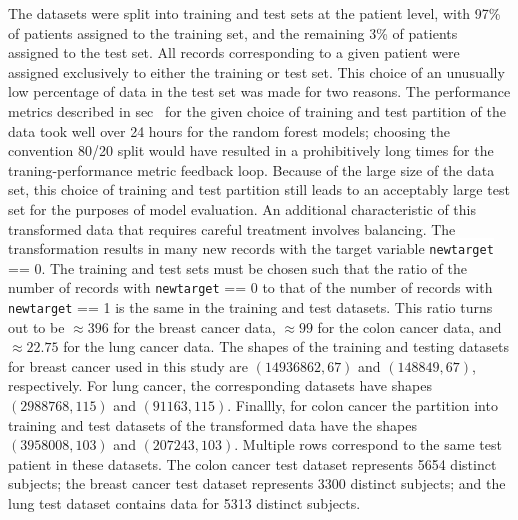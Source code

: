 \documentclass[10pt,letterpaper]{article}
\newcommand{\codewhite}[1]{\colorbox{white}{\texttt{#1}}}
\begin{document}
The datasets were split into training and test sets at the patient level, with 97\% of patients assigned to the training set, and the remaining 3\% of patients assigned to the test set.
All records corresponding to a given patient were assigned exclusively to either the training or test set.
This choice of an unusually low percentage of data in the test set was made for two reasons. The performance metrics described in sec~ for the given choice of training and test partition of the data took well over 24 hours for the random forest models; choosing the convention 80/20 split would have resulted in a prohibitively long times for the traning-performance metric feedback loop. Because of the large size of the data set, this choice of training and test partition still leads to an acceptably large test set for the purposes of model evaluation.
An additional characteristic of this transformed data that requires careful treatment involves balancing. The transformation results in many new records with the target variable \codewhite{newtarget} == 0. The training and test sets must be chosen such that the ratio of the number of records with \codewhite{newtarget} == 0 to that of the number of records with \codewhite{newtarget} == 1 is the same in the training and test datasets.
This ratio turns out to be $\approx 396$ for the breast cancer data, $\approx  99$ for the colon cancer data, and 
$\approx 22.75$ for the lung cancer data. 
The shapes of the training and testing datasets for breast cancer used in this study are $(14936862, 67)$ and 
$(148849, 67)$, respectively.
For lung cancer, the corresponding datasets have shapes $(2988768, 115)$ and $(91163, 115)$.
Finallly, for colon cancer the partition into training and test datasets of the transformed data have the shapes 
$(3958008, 103)$ and $(207243, 103)$. Multiple rows correspond to the same test patient in these datasets.
The colon cancer test dataset represents 5654 distinct subjects; the breast cancer test dataset represents 3300 distinct subjects; and the lung test dataset contains data for 5313 distinct subjects.
\end{document}
